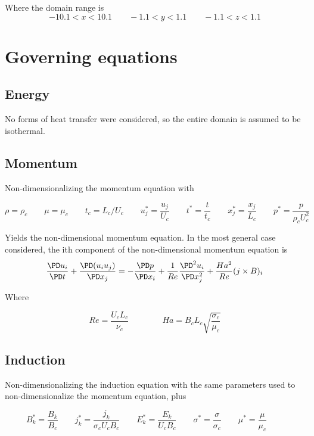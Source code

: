 \documentclass[11pt]{article}
\begin{document}
Where the domain range is
\begin{equation}
	-10.1 < x < 10.1 \qquad -1.1 < y < 1.1 \qquad -1.1 < z < 1.1
\end{equation}

\section{Governing equations}

\subsection{Energy}
No forms of heat transfer were considered, so the entire domain is assumed to be isothermal.

\subsection{Momentum}
Non-dimensionalizing the momentum equation with

\begin{equation}
	\rho = \rho_c \qquad
	\mu = \mu_c \qquad
	t_c = L_c/U_c \qquad
	u_j^* = \frac{u_j}{U_c} \qquad
	t^* = \frac{t}{t_c} \qquad
	x_j^* = \frac{x_j}{L_c} \qquad
	p^* = \frac{p}{\rho_c U_c^2} \qquad
\end{equation}

Yields the non-dimensional momentum equation. In the most general case considered, the ith component of the non-dimensional momentum equation is
\begin{equation}
	\frac{\PD u_i}{\PD t} +
	\frac{\PD (u_i u_j)}{\PD x_j}
	=
	- \frac{\PD p}{\PD x_i}
	+ \frac{1}{Re}
	\frac{\PD^2 u_i}{\PD x_j^2}
	+ \frac{Ha^2}{Re}
	(j \times B)_i
\end{equation}

Where

\begin{equation}
	Re = \frac{U_c L_c}{\nu_c}
	\qquad \qquad
	Ha = B_c L_c \sqrt{\frac{\sigma_c}{\mu_c}}
\end{equation}

\subsection{Induction}
Non-dimensionalizing the induction equation with the same parameters used to non-dimensionalize the momentum equation, plus

\begin{equation}
	B_k^* = \frac{B_k}{B_c}  \qquad
	j_k^* = \frac{j_k}{\sigma_c U_c B_c} \qquad
	E_k^* = \frac{E_k}{U_c B_c} \qquad
	\sigma^* = \frac{\sigma}{\sigma_c} \qquad
	\mu^* = \frac{\mu}{\mu_c} \qquad
\end{equation}
\end{document}
